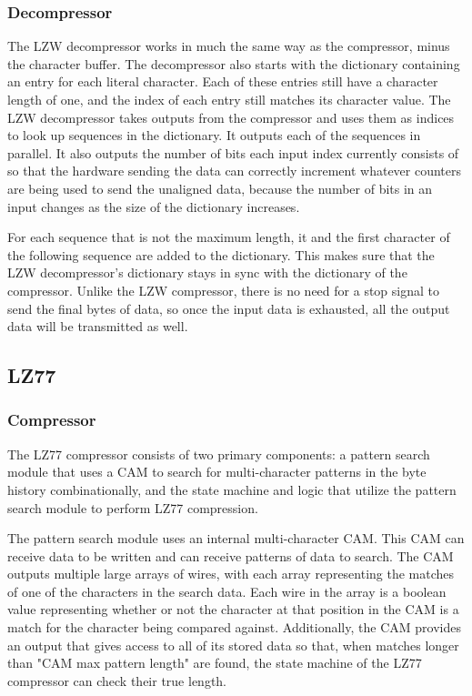 \documentclass[doublespace,nopageskip]{VTthesis}
\begin{document}
\subsubsection{Decompressor}\label{sss:decompressor}
The LZW decompressor works in much the same way as the compressor, minus the character buffer. The decompressor also starts with the dictionary containing an entry for each literal character. Each of these entries still have a character length of one, and the index of each entry still matches its character value. The LZW decompressor takes outputs from the compressor and uses them as indices to look up sequences in the dictionary. It outputs each of the sequences in parallel. It also outputs the number of bits each input index currently consists of so that the hardware sending the data can correctly increment whatever counters are being used to send the unaligned data, because the number of bits in an input changes as the size of the dictionary increases.

For each sequence that is not the maximum length, it and the first character of the following sequence are added to the dictionary. This makes sure that the LZW decompressor's dictionary stays in sync with the dictionary of the compressor. Unlike the LZW compressor, there is no need for a stop signal to send the final bytes of data, so once the input data is exhausted, all the output data will be transmitted as well.

\subsection{LZ77}\label{ss:lz77}
\subsubsection{Compressor}\label{sss:compressor}
The LZ77 compressor consists of two primary components: a pattern search module that uses a CAM to search for multi-character patterns in the byte history combinationally, and the state machine and logic that utilize the pattern search module to perform LZ77 compression.

The pattern search module uses an internal multi-character CAM. This CAM can receive data to be written and can receive patterns of data to search. The CAM outputs multiple large arrays of wires, with each array representing the matches of one of the characters in the search data. Each wire in the array is a boolean value representing whether or not the character at that position in the CAM is a match for the character being compared against. Additionally, the CAM provides an output that gives access to all of its stored data so that, when matches longer than "CAM max pattern length" are found, the state machine of the LZ77 compressor can check their true length.
\end{document}
